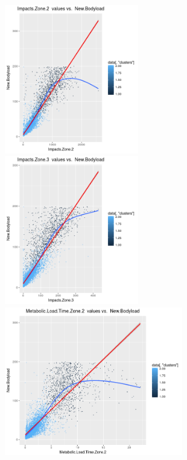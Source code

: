 \begin{figure}[h]
\begin{minipage}{.33\textwidth}
		\captionsetup{width=.8\linewidth}
	\end{minipage}
	\newline
	\centering
	\begin{minipage}{.33\textwidth}
		\centering
		\includegraphics[width=\linewidth, height=6.5cm]{Images/ImpactsZone2vsNBL.png}
		\captionsetup{width=.8\linewidth}
	\end{minipage}%
	\hfill
	\begin{minipage}{.33\textwidth}
		\centering
		\includegraphics[width=\linewidth, height=6.5cm]{Images/ImpactsZone3vsNBL.png}
		\captionsetup{width=.8\linewidth}
	\end{minipage} %
	\hfill
	\begin{minipage}{.33\textwidth}
		\centering
		\includegraphics[width=\linewidth, height=6.5cm]{Images/MetLoad2vsNBL.png}
		\captionsetup{width=.95\linewidth}
	\end{minipage}
\end{figure}
\break\hfill

